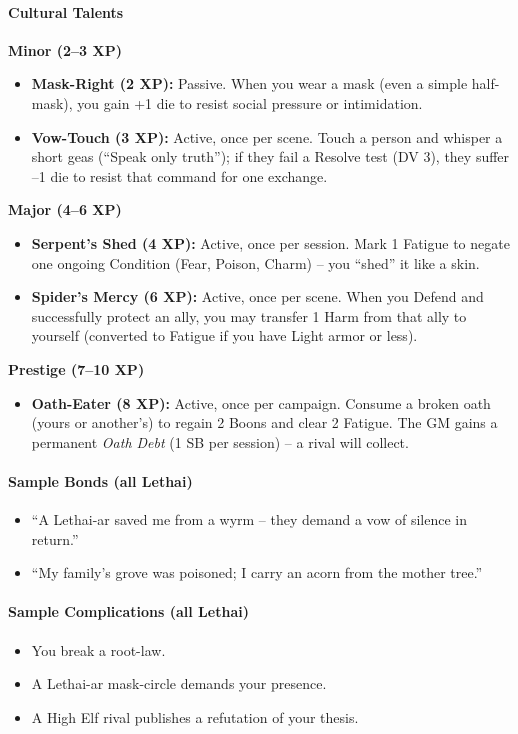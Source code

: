 \paragraph{Cultural Talents}

\textbf{Minor (2--3 XP)}
\begin{itemize}
  \item \textbf{Mask-Right (2 XP):} Passive. When you wear a mask (even a simple half-mask), you gain +1 die to resist social pressure or intimidation.
  \item \textbf{Vow-Touch (3 XP):} Active, once per scene. Touch a person and whisper a short geas (``Speak only truth''); if they fail a Resolve test (DV 3), they suffer --1 die to resist that command for one exchange.
\end{itemize}

\textbf{Major (4--6 XP)}
\begin{itemize}
  \item \textbf{Serpent's Shed (4 XP):} Active, once per session. Mark 1 Fatigue to negate one ongoing Condition (Fear, Poison, Charm) -- you ``shed'' it like a skin.
  \item \textbf{Spider's Mercy (6 XP):} Active, once per scene. When you Defend and successfully protect an ally, you may transfer 1 Harm from that ally to yourself (converted to Fatigue if you have Light armor or less).
\end{itemize}

\textbf{Prestige (7--10 XP)}
\begin{itemize}
  \item \textbf{Oath-Eater (8 XP):} Active, once per campaign. Consume a broken oath (yours or another's) to regain 2 Boons and clear 2 Fatigue. The GM gains a permanent \emph{Oath Debt} (1 SB per session) -- a rival will collect.
\end{itemize}

\paragraph{Sample Bonds (all Lethai)}
\begin{itemize}
  \item ``A Lethai-ar saved me from a wyrm -- they demand a vow of silence in return.''
  \item ``My family's grove was poisoned; I carry an acorn from the mother tree.''
\end{itemize}

\paragraph{Sample Complications (all Lethai)}
\begin{itemize}
  \item You break a root-law.
  \item A Lethai-ar mask-circle demands your presence.
  \item A High Elf rival publishes a refutation of your thesis.
\end{itemize}

